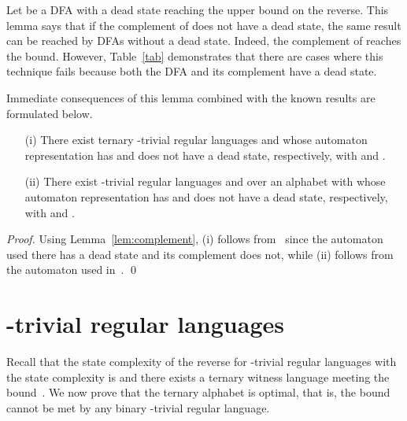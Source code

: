 \documentclass[runningheads]{llncs}
\newcommand{\R}{}
\newcommand{\J}{}
\begin{document}
  Let  be a DFA with a dead state reaching the upper bound on the reverse. This lemma says that if the complement of  does not have a dead state, the same result can be reached by DFAs without a dead state. Indeed, the complement of  reaches the bound. However, Table~\ref{tab} demonstrates that there are cases where this technique fails because both the DFA and its complement have a dead state. 
  
  Immediate consequences of this lemma combined with the known results are formulated below.
  \begin{corollary}\label{cor:bound}
    \begin{itemize}
      \item[(i)] There exist ternary \R-trivial regular languages  and  whose automaton representation has and does not have a dead state, respectively, with  and . 
      \item[(ii)] There exist \J-trivial regular languages  and  over an alphabet  with  whose automaton representation has and does not have a dead state, respectively, with  and .
    \end{itemize}
  \end{corollary}
  \begin{proof}
    Using Lemma~\ref{lem:complement},
    (i) follows from~\cite[Lemma~3, p.~232]{ciaa2012} since the automaton used there has a dead state and its complement does not,
    while (ii) follows from the automaton used in~\cite[Theorem~5, p.~15]{BrArXiv12}.
  \qed
  \end{proof}


\section{\R-trivial regular languages}
  Recall that the state complexity of the reverse for \R-trivial regular languages with the state complexity  is  and there exists a ternary witness language meeting the bound~\cite{ciaa2012}. 
  We now prove that the ternary alphabet is optimal,
  that is, the bound
  cannot be met by any binary \R-trivial regular language. 
\end{document}
